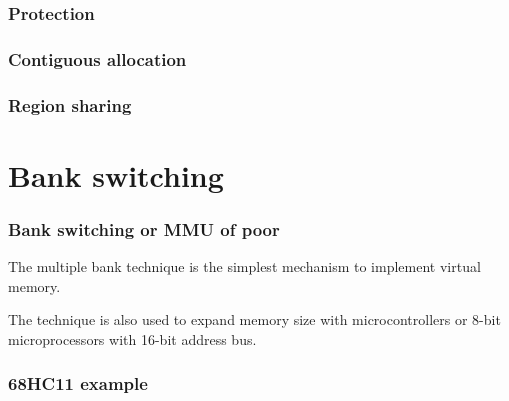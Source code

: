 
\begin{frame}
  \frametitle{Protection}

  \begin{center}
  \end{center}

\end{frame}


\begin{frame}
  \frametitle{Contiguous allocation}

  \begin{center}
  \end{center}

\end{frame}


\begin{frame}
  \frametitle{Region sharing}

  \begin{center}
  \end{center}

\end{frame}

%
%

\section{Bank switching}


\begin{frame}
  \frametitle{Bank switching or MMU of poor}

  The multiple bank technique is the simplest mechanism to implement
  virtual memory.

  \-

  The technique is also used to expand memory size with
  microcontrollers or 8-bit microprocessors with 16-bit address bus.

\end{frame}


\begin{frame}
  \frametitle{68HC11 example}

  \begin{center}
  \end{center}

\end{frame}

